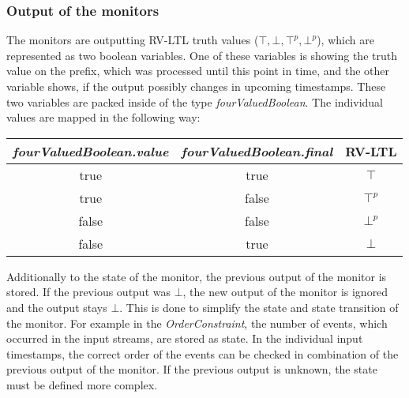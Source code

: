\subsubsection{Output of the  monitors}
	The monitors are outputting RV-LTL truth values ($\top, \bot, \top^p, \bot^p$), which are represented as two boolean variables. One of these variables is showing the truth value on the prefix, which was processed until this point in time, and the other variable shows, if the output possibly changes in upcoming timestamps. These two variables are packed inside of the type \textit{fourValuedBoolean}. The individual values are mapped in the following way: 
	\begin{table}[H]
		\begin{tabular}{|c|c|c|}
			\hline
			\textit{fourValuedBoolean.value} & \textit{fourValuedBoolean.final} & RV-LTL \\
			\hline
			true & true &  $\top$\\
			\hline
			true & false &  $\top^p$\\
			\hline
			false & false & $\bot^p$ \\
			\hline
			false & true &  $\bot$\\
			\hline
		\end{tabular}
		\centering
	\end{table}
	Additionally to the state of the monitor, the previous output of the monitor is stored. If the previous output was $\bot$, the new output of the monitor is ignored and the output stays $\bot$. This is done to simplify the state and state transition of the monitor. For example in the \textit{OrderConstraint}, the number of events, which occurred in the input streams, are stored as state. In the individual input timestamps, the correct order of the events can be checked in combination of the previous output of the monitor. If the previous output is unknown, the state must be defined more complex.
	 
